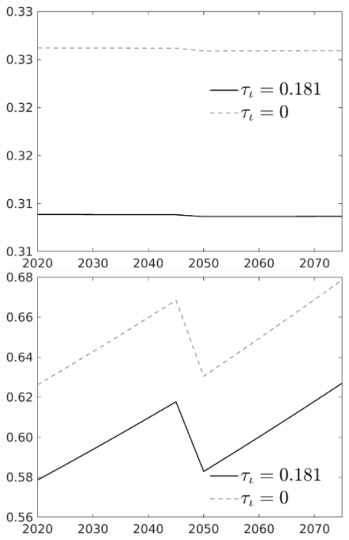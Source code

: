 \documentclass[12pt]{article}
\begin{document}
\begin{figure}[h!!]
\begin{minipage}[]{0.32\textwidth}
	\end{minipage}	
	\begin{minipage}[]{0.32\textwidth}
		\includegraphics[width=1\textwidth]{../../codding_model/own_basedOnFried/optimalPol_010922_revision/figures/all_13Sept22/CompTauf_bytaul_Reg0_hl_spillover0_nsk0_xgr0_knspil1_sep0_LFlimit1_emsbase0_countec0_GovRev0_etaa0.79_lgd1.png}
	\end{minipage}	
	\begin{minipage}[]{0.32\textwidth}
		\includegraphics[width=1\textwidth]{../../codding_model/own_basedOnFried/optimalPol_010922_revision/figures/all_13Sept22/CompTauf_bytaul_Reg0_C_spillover0_nsk0_xgr0_knspil1_sep0_LFlimit1_emsbase0_countec0_GovRev0_etaa0.79_lgd1.png}

\end{minipage}
\end{figure}
\end{document}
